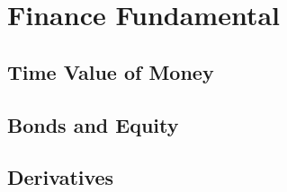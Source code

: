 \chapter{Finance Fundamental}
\section{Time Value of Money}
\section{Bonds and Equity}
\section{Derivatives}
